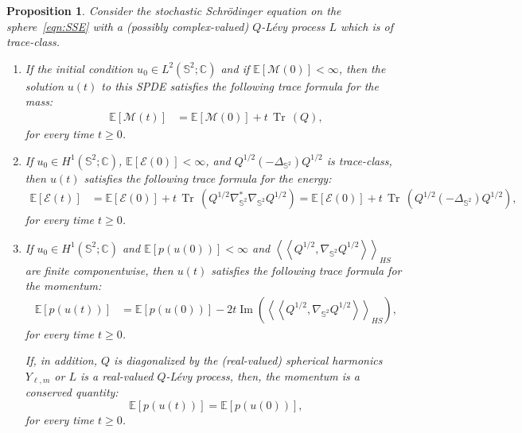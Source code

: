 \documentclass[11pt]{amsart}
\newtheorem{proposition}[theorem]{Proposition}
\newcommand{\IC}{\mathbb{C}}
\newcommand{\E}{{\mathbb E}}
\newcommand{\IS}{\mathbb{S}}
\newcommand{\tr}{{\operatorname{Tr}\, }}
\newcommand{\cE}{\mathcal E}
\newcommand{\cM}{\mathcal M}
\newcommand{\Deltalb}{\Delta_{\IS^2}}
\newcommand{\nablalb}{\nabla_{\IS^{2}}}
\begin{document}
\begin{proposition}
    \label{prop:exact}
    Consider the stochastic Schrödinger equation on the sphere~\eqref{eqn:SSE}
    with a (possibly complex-valued) $Q$-Lévy process $L$ which is of trace-class.

    \begin{enumerate}[label=\roman*)]
    \item If the initial condition $u_0 \in {L^2(\IS^2; \IC)}$ and
    if $\E\left[\cM(0)\right] < \infty$, then the solution $u(t)$ to this SPDE satisfies the following trace formula for the mass: 
    \begin{align*}
        \E\left[\cM(t)\right] &= \E\left[\cM(0)\right] + t\,\tr(Q),
    \end{align*}
    for every time $t \geq 0$.
%
    \item If $u_0 \in {H^1(\IS^2; \IC)}$, $\E\left[\cE(0)\right] < \infty$, and
    $Q^{1/2} (-\Deltalb) Q^{1/2}$ is trace-class, then $u(t)$ satisfies the following trace formula for the energy:
    \begin{align*}
        \E\left[\cE(t)\right] &= \E\left[\cE(0)\right] + t\,\tr(Q^{1/2}\nablalb^\ast\nablalb Q^{1/2}) =  \E\left[\cE(0)\right] + t\,\tr(Q^{1/2} (-\Deltalb) Q^{1/2}),
    \end{align*}
    for every time $t \geq 0$.

    \item If $u_0 \in {H^1(\IS^2; \IC)}$ and $\mathbb E\left[p(u(0))\right]<\infty$ and $\left<\left<Q^{1/2},\nablalb Q^{1/2}\right>\right>_{HS}$ are finite componentwise,
	then $u(t)$ satisfies the following trace formula for the momentum:
    \begin{align*}
        \E\left[p(u(t))\right] &= \E\left[p(u(0))\right]-2t\operatorname{Im}\left(\left<\left<Q^{1/2},\nablalb Q^{1/2}\right>\right>_{HS}\right),
    \end{align*}
    for every time $t \geq 0$.

    If, in addition, $Q$ is diagonalized by the (real-valued) spherical harmonics $Y_{\ell,m}$ or $L$ is a real-valued $Q$-L\'evy process, then,
    the momentum is a conserved quantity:
	$$
	\E\left[p(u(t))\right] = \E\left[p(u(0))\right],
	$$
    for every time $t \geq 0$.
     \end{enumerate}
\end{proposition}
\end{document}
